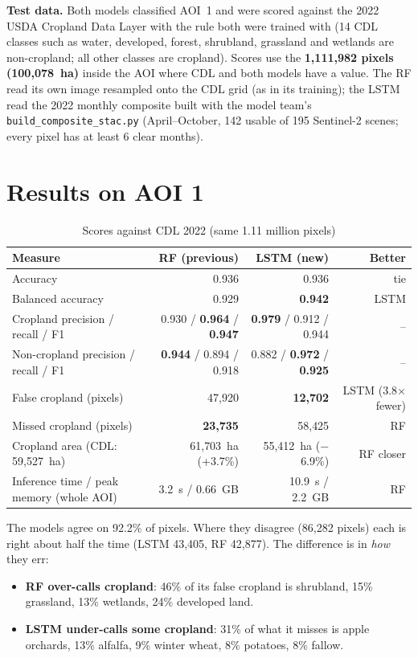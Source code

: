 \documentclass[11pt,a4paper]{article}
\begin{document}
\textbf{Test data.} Both models classified AOI~1 and were scored against the 2022 USDA Cropland Data Layer with
the rule both were trained with (14 CDL classes such as water, developed, forest, shrubland, grassland and wetlands
are non-cropland; all other classes are cropland). Scores use the \textbf{1{,}111{,}982 pixels (100{,}078~ha)} inside the
AOI where CDL and both models have a value. The RF read its own image resampled onto the CDL grid (as in its
training); the LSTM read the 2022 monthly composite built with the model team's \texttt{build\_composite\_stac.py}
(April--October, 142 usable of 195 Sentinel-2 scenes; every pixel has at least 6 clear months).

\section{Results on AOI 1}
\begin{table}[h]
\centering\small
\caption{Scores against CDL 2022 (same 1.11 million pixels)}
\begin{tabular}{lrrr}
\toprule
\textbf{Measure} & \textbf{RF (previous)} & \textbf{LSTM (new)} & \textbf{Better}\\
\midrule
Accuracy & 0.936 & 0.936 & tie\\
Balanced accuracy & 0.929 & \textbf{0.942} & LSTM\\
Cropland precision / recall / F1 & 0.930 / \textbf{0.964} / \textbf{0.947} & \textbf{0.979} / 0.912 / 0.944 & --\\
Non-cropland precision / recall / F1 & \textbf{0.944} / 0.894 / 0.918 & 0.882 / \textbf{0.972} / \textbf{0.925} & --\\
False cropland (pixels) & 47{,}920 & \textbf{12{,}702} & LSTM (3.8$\times$ fewer)\\
Missed cropland (pixels) & \textbf{23{,}735} & 58{,}425 & RF\\
Cropland area (CDL: 59{,}527~ha) & 61{,}703~ha (+3.7\%) & 55{,}412~ha ($-$6.9\%) & RF closer\\
Inference time / peak memory (whole AOI) & 3.2~s / 0.66~GB & 10.9~s / 2.2~GB & RF\\
\bottomrule
\end{tabular}
\end{table}

The models agree on 92.2\% of pixels. Where they disagree (86{,}282 pixels) each is right about half the time
(LSTM 43{,}405, RF 42{,}877). The difference is in \emph{how} they err:
\begin{itemize}
  \item \textbf{RF over-calls cropland}: 46\% of its false cropland is shrubland, 15\% grassland, 13\% wetlands, 24\% developed land.
  \item \textbf{LSTM under-calls some cropland}: 31\% of what it misses is apple orchards, 13\% alfalfa, 9\% winter wheat, 8\% potatoes, 8\% fallow.
\end{itemize}
\end{document}
